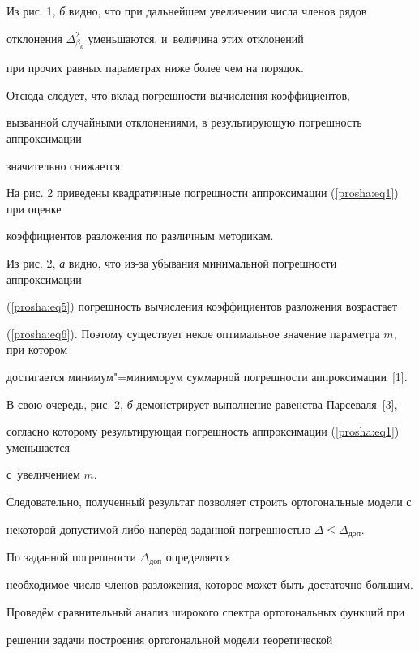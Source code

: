 Из рис. 1, {\sl б} видно, что при дальнейшем увеличении числа членов рядов

отклонения $\Delta _{\beta _k } ^2$ уменьшаются, и~величина этих отклонений

при прочих равных параметрах ниже более чем на порядок.

Отсюда следует, что вклад погрешности вычисления коэффициентов,

вызванной случайными отклонениями, в результирующую погрешность аппроксимации

значительно снижается.



На рис. 2 приведены квадратичные погрешности аппроксимации (\ref{prosha:eq1}) при оценке

коэффициентов разложения по различным методикам.





Из рис. 2, {\sl а} видно, что из-за убывания минимальной погрешности аппроксимации

(\ref{prosha:eq5}) погрешность вычисления коэффициентов разложения возрастает

(\ref{prosha:eq6}). Поэтому существует некое оптимальное значение параметра $m$, при котором

достигается минимум"=миниморум суммарной погрешности аппроксимации~[1].



В свою очередь, рис. 2, {\sl б} демонстрирует выполнение равенства Парсеваля~[3],

согласно которому результирующая погрешность аппроксимации (\ref{prosha:eq1}) уменьшается

с~увеличением $m$.



Следовательно, полученный результат позволяет строить ортогональные модели с

некоторой допустимой либо наперёд заданной погрешностью \linebreak \mbox{$\Delta \leqslant \Delta _{\text{доп}} $. }

По заданной погрешности $\Delta_{\text{доп}} $ определяется

необходимое число членов разложения, которое может быть достаточно большим.



Проведём сравнительный анализ широкого спектра ортогональных функций при

решении задачи построения ортогональной модели теоретической

